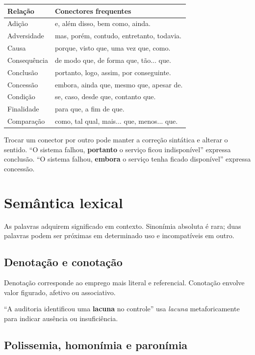 \begin{table}[ht]
\centering
\small
\begin{tabularx}{\textwidth}{l X}
\toprule
Relação & Conectores frequentes \\
\midrule
Adição & e, além disso, bem como, ainda. \\
Adversidade & mas, porém, contudo, entretanto, todavia. \\
Causa & porque, visto que, uma vez que, como. \\
Consequência & de modo que, de forma que, tão... que. \\
Conclusão & portanto, logo, assim, por conseguinte. \\
Concessão & embora, ainda que, mesmo que, apesar de. \\
Condição & se, caso, desde que, contanto que. \\
Finalidade & para que, a fim de que. \\
Comparação & como, tal qual, mais... que, menos... que. \\
\bottomrule
\end{tabularx}
\end{table}

Trocar um conector por outro pode manter a correção sintática e alterar o sentido. ``O sistema falhou, \textbf{portanto} o serviço ficou indisponível'' expressa conclusão. ``O sistema falhou, \textbf{embora} o serviço tenha ficado disponível'' expressa concessão.

\section{Semântica lexical}

As palavras adquirem significado em contexto. Sinonímia absoluta é rara; duas palavras podem ser próximas em determinado uso e incompatíveis em outro.

\subsection{Denotação e conotação}

Denotação corresponde ao emprego mais literal e referencial. Conotação envolve valor figurado, afetivo ou associativo.

``A auditoria identificou uma \textbf{lacuna} no controle'' usa \emph{lacuna} metaforicamente para indicar ausência ou insuficiência.

\subsection{Polissemia, homonímia e paronímia}

